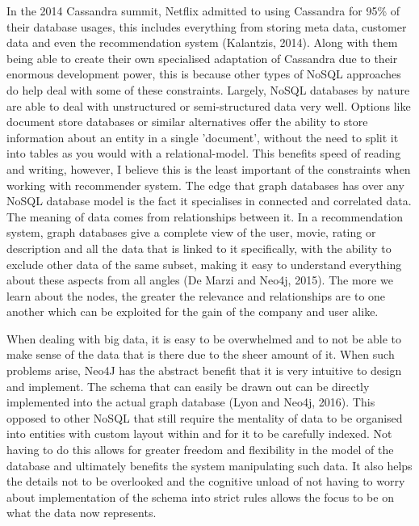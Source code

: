 \documentclass[a4paper]{article}
\begin{document}
In the 2014 Cassandra summit, Netflix admitted to using Cassandra for 95\% of their database usages, this includes everything from storing meta data, customer data and even the recommendation system (Kalantzis, 2014). Along with them being able to create their own specialised adaptation of Cassandra due to their enormous development power, this is because other types of NoSQL approaches do help deal with some of these constraints. Largely, NoSQL databases by nature are able to deal with unstructured or semi-structured data very well. Options like document store databases or similar alternatives offer the ability to store information about an entity in a single 'document', without the need to split it into tables as you would with a relational-model. This benefits speed of reading and writing, however, I believe this is the least important of the constraints when working with recommender system. The edge that graph databases has over any NoSQL database model is the fact it specialises in connected and correlated data. The meaning of data comes from relationships between it. In a recommendation system, graph databases give a complete view of the user, movie, rating or description and all the data that is linked to it specifically, with the ability to exclude other data of the same subset, making it easy to understand everything about these aspects from all angles (De Marzi and Neo4j, 2015). The more we learn about the nodes, the greater the relevance and relationships are to one another which can be exploited for the gain of the company and user alike. \par

When dealing with big data, it is easy to be overwhelmed and to not be able to make sense of the data that is there due to the sheer amount of it. When such problems arise, Neo4J has the abstract benefit that it is very intuitive to design and implement. The schema that can easily be drawn out can be directly implemented into the actual graph database (Lyon and Neo4j, 2016). This opposed to other NoSQL that still require the mentality of data to be organised into entities with custom layout within and for it to be carefully indexed. Not having to do this allows for greater freedom and flexibility in the model of the database and ultimately benefits the system manipulating such data. It also helps the details not to be overlooked and the cognitive unload of not having to worry about implementation of the schema into strict rules allows the focus to be on what the data now represents.\par
\end{document}
